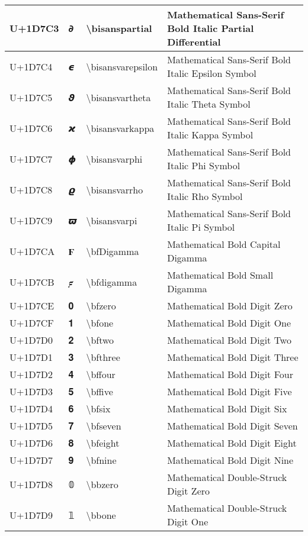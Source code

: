 \begin{table}[h]
\begin{tabulary}{\linewidth}{|L|L|L|L|}
\hline
U+1D7C3 & 𝟃 & {\textbackslash}bisanspartial & Mathematical Sans-Serif Bold Italic Partial Differential \\
\hline
U+1D7C4 & 𝟄 & {\textbackslash}bisansvarepsilon & Mathematical Sans-Serif Bold Italic Epsilon Symbol \\
\hline
U+1D7C5 & 𝟅 & {\textbackslash}bisansvartheta & Mathematical Sans-Serif Bold Italic Theta Symbol \\
\hline
U+1D7C6 & 𝟆 & {\textbackslash}bisansvarkappa & Mathematical Sans-Serif Bold Italic Kappa Symbol \\
\hline
U+1D7C7 & 𝟇 & {\textbackslash}bisansvarphi & Mathematical Sans-Serif Bold Italic Phi Symbol \\
\hline
U+1D7C8 & 𝟈 & {\textbackslash}bisansvarrho & Mathematical Sans-Serif Bold Italic Rho Symbol \\
\hline
U+1D7C9 & 𝟉 & {\textbackslash}bisansvarpi & Mathematical Sans-Serif Bold Italic Pi Symbol \\
\hline
U+1D7CA & 𝟊 & {\textbackslash}bfDigamma & Mathematical Bold Capital Digamma \\
\hline
U+1D7CB & 𝟋 & {\textbackslash}bfdigamma & Mathematical Bold Small Digamma \\
\hline
U+1D7CE & 𝟎 & {\textbackslash}bfzero & Mathematical Bold Digit Zero \\
\hline
U+1D7CF & 𝟏 & {\textbackslash}bfone & Mathematical Bold Digit One \\
\hline
U+1D7D0 & 𝟐 & {\textbackslash}bftwo & Mathematical Bold Digit Two \\
\hline
U+1D7D1 & 𝟑 & {\textbackslash}bfthree & Mathematical Bold Digit Three \\
\hline
U+1D7D2 & 𝟒 & {\textbackslash}bffour & Mathematical Bold Digit Four \\
\hline
U+1D7D3 & 𝟓 & {\textbackslash}bffive & Mathematical Bold Digit Five \\
\hline
U+1D7D4 & 𝟔 & {\textbackslash}bfsix & Mathematical Bold Digit Six \\
\hline
U+1D7D5 & 𝟕 & {\textbackslash}bfseven & Mathematical Bold Digit Seven \\
\hline
U+1D7D6 & 𝟖 & {\textbackslash}bfeight & Mathematical Bold Digit Eight \\
\hline
U+1D7D7 & 𝟗 & {\textbackslash}bfnine & Mathematical Bold Digit Nine \\
\hline
U+1D7D8 & 𝟘 & {\textbackslash}bbzero & Mathematical Double-Struck Digit Zero \\
\hline
U+1D7D9 & 𝟙 & {\textbackslash}bbone & Mathematical Double-Struck Digit One \\

\end{tabulary}
\end{table}
